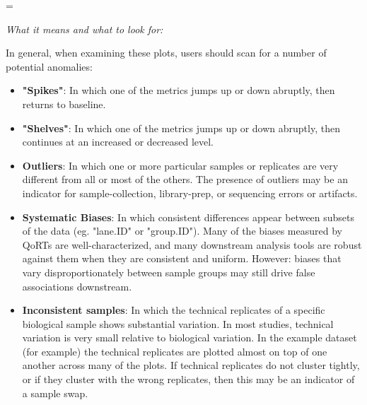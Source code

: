 \documentclass[12pt]{article}
\makeatletter
\let\realnormalsize=\normalsize
\def\liih@math{\ifmmode$\else\bad@math\fi}
\def\adjustnormalsize{\def\normalsize{\mathsurround=0pt \realnormalsize
 \parindent=0pt\abovedisplayskip=0pt\belowdisplayskip=0pt}%
 \def\phantompar{\csname par\endcsname}\normalsize}%
\newcommand\lthtmlvboxmathA{\adjustnormalsize\setbox\sizebox=\vbox\bgroup %
 \let\ifinner=\iffalse \let\)\liih@math }%
\newcommand\lthtmlmathtype[1]{\gdef\lthtmlmathenv{#1}}%
\newcommand\lthtmlfigureA[1]{\let\@savefreelist\@freelist
       \lthtmlmathtype{#1}\lthtmlvboxmathA}%
\makeatother
\begin{document}
{\newpage\clearpage
\lthtmlfigureA{framed812}%
\begin{framed}
\emph{What it means and what to look for:} 
\par
In general, when examining these plots, users should scan for a number of potential anomalies:
  \begin{itemize} \small
    \item \textbf{"Spikes"}: In which one of the metrics jumps up or down abruptly, then returns to baseline.
    \item \textbf{"Shelves"}: In which one of the metrics jumps up or down abruptly, then continues at an increased or decreased level.
    \item \textbf{Outliers}: In which one or more particular samples or replicates are very different from all or most of the others. The presence of outliers may be an indicator for sample-collection, library-prep, or sequencing errors or artifacts.
    \item \textbf{Systematic Biases}: In which consistent differences appear between subsets of the data (eg. "lane.ID" or "group.ID"). Many of the biases measured by QoRTs are well-characterized, and many downstream analysis tools are robust against them when they are consistent and uniform. However: biases that vary disproportionately between sample groups may still drive false associations downstream.
    \item \textbf{Inconsistent samples}: In which the technical replicates of a specific biological sample shows substantial variation. In most studies, technical variation is very small relative to biological variation. In the example dataset (for example) the technical replicates are plotted almost on top of one another across many of the plots. If technical replicates do not cluster tightly, or if they cluster with the wrong replicates, then this may be an indicator of a sample swap.
  \end{itemize}
\par

\end{framed}}
\end{document}

